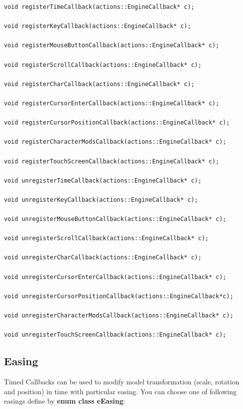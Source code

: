\documentclass{article}
\begin{document}
\begin{lstlisting}
void registerTimeCallback(actions::EngineCallback* c);

void registerKeyCallback(actions::EngineCallback* c);

void registerMouseButtonCallback(actions::EngineCallback* c);

void registerScrollCallback(actions::EngineCallback* c);

void registerCharCallback(actions::EngineCallback* c);

void registerCursorEnterCallback(actions::EngineCallback* c);

void registerCursorPositionCallback(actions::EngineCallback* c);

void registerCharacterModsCallback(actions::EngineCallback* c);

void registerTouchScreenCallback(actions::EngineCallback* c);

void unregisterTimeCallback(actions::EngineCallback* c);

void unregisterKeyCallback(actions::EngineCallback* c);

void unregisterMouseButtonCallback(actions::EngineCallback* c);

void unregisterScrollCallback(actions::EngineCallback* c);

void unregisterCharCallback(actions::EngineCallback* c);

void unregisterCursorEnterCallback(actions::EngineCallback* c);

void unregisterCursorPositionCallback(actions::EngineCallback*c);

void unregisterCharacterModsCallback(actions::EngineCallback* c);

void unregisterTouchScreenCallback(actions::EngineCallback* c);
\end{lstlisting}

\newpage

\subsection{Easing}\label{sec:Easing}

\indent \indent Timed Callbacks can be used to modify model transformation (scale, rotation and position) in time with particular easing. You can choose one of following easings define by \textbf{enum class eEasing}:
\end{document}
